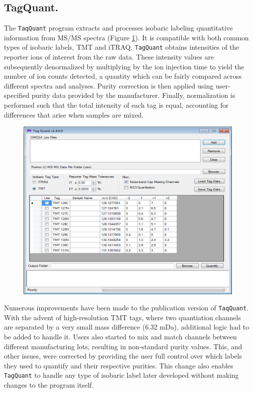 \subsection*{TagQuant.}
The \texttt{TaqQuant} program extracts and processes isobaric labeling quantitative information from MS/MS spectra (Figure \ref{fig:tagquant}). It is compatible with both common types of isobaric labels, TMT and iTRAQ.\cite{tmt,itraq} \texttt{TagQuant} obtains intensities of the reporter ions of interest from the raw data. These intensity values are subsequently denormalized by multiplying by the ion injection time to yield the number of ion counts detected, a quantity which can be fairly compared across different spectra and analyses. Purity correction is then applied using user-specified purity data provided by the manufacturer.\cite{itracker} Finally, normalization is performed such that the total intensity of each tag is equal, accounting for differences that arise when samples are mixed.
\begin{figure}[p]
	\centering
	\includegraphics[width=\columnwidth]{csmsl/tagquant.png}
	\label{fig:tagquant}
\end{figure}

Numerous improvements have been made to the publication version of \texttt{TaqQuant}. With the advent of high-resolution TMT tags, where two quantiation channels are separated by a very small mass difference (6.32 mDa), additional logic had to be added to handle it.\cite{tmt8,tmt82} Users also started to mix and match channels between different manufacturing lots, resulting in non-standard purity values. This, and other issues, were corrected by providing the user full control over which labels they used to quantify and their respective purities. This change also enables \texttt{TagQuant} to handle any type of isobaric label later developed without making changes to the program itself.


